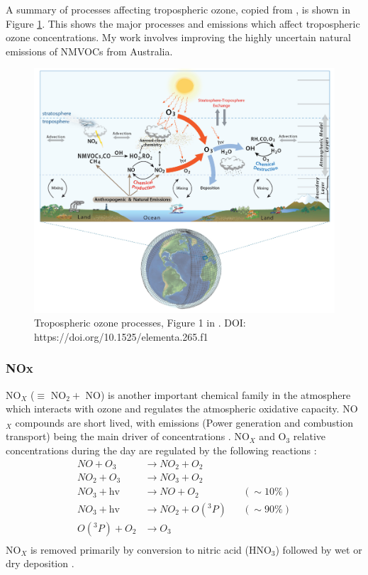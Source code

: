   A summary of processes affecting tropospheric ozone, copied from \cite{Young2018}, is shown in Figure \ref{LR:O3:fig_YoungOzoneSummary}.
  This shows the major processes and emissions which affect tropospheric ozone concentrations.
  My work involves improving the highly uncertain natural emissions of NMVOCs from Australia.
  
  \begin{figure}
    \includegraphics[width=\textwidth]{Figures/Young2018_Figure1.png}
    \caption{%
      Tropospheric ozone processes, Figure 1 in \cite{Young2018}.
      DOI: https://doi.org/10.1525/elementa.265.f1
      }
    \label{LR:O3:fig_YoungOzoneSummary}
  \end{figure}
  
  \subsubsection{NOx}
    NO$_X$ ($\equiv $ NO$_2 +$ NO) is another important chemical family in the atmosphere which interacts with ozone and regulates the atmospheric oxidative capacity.
    NO$_X$ compounds are short lived, with emissions (Power generation and combustion transport) being the main driver of concentrations \citep{Delmas1997}.
    NO$_X$ and O$_3$ relative concentrations during the day are regulated by the following reactions \citep{Sillman1999,Atkinson2000}:
    \begin{equation}
      \begin{aligned}
        NO + O_3         & \to NO_2 + O_2      && \\%
        NO_2 + O_3       & \to NO_3 + O_2      && \\%
        NO_3 + \text{hv} & \to NO + O_2        && (\sim 10\%)  \\%
        NO_3 + \text{hv} & \to NO_2 + O({}^3P) && (\sim 90\%)  \\%
        O({}^3P) + O_2   & \to O_3 			 && \\%
      \end{aligned}
      \label{LR:Atmos:Chem:eqn_NOandO3}
    \end{equation}
    NO$_X$ is removed primarily by conversion to nitric acid (HNO$_3$) followed by wet or dry deposition \citep{Ayers2006}.
  
